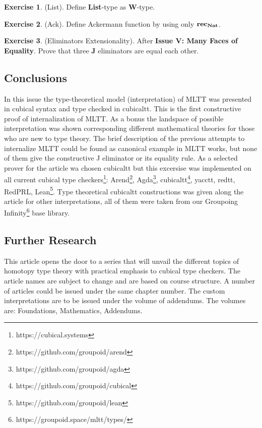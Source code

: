 \documentclass[twoside]{article}
\theoremstyle{definition}
\newtheorem{exercise}{Exercise}
\begin{document}
\begin{exercise} (List). Define {\bf List}-type as {\bf W}-type.
\end{exercise}

\begin{exercise} (Ack). Define Ackermann function by using only ${\bf rec_{Nat}}$.
\end{exercise}

\begin{exercise} (Eliminators Extensionality). After {\bf Issue V: Many Faces of Equality}. Prove that
three {\bf J} eliminators are equal each other.
\end{exercise}

\subsection*{Conclusions}

In this issue the type-theoretical model (interpretation) of MLTT was
presented in cubical syntax and type checked in cubicaltt.
This is the first constructive proof of internalization of MLTT.
As a bonus the landspace of possible interpretation was shown
corresponding different mathematical theories for those who are new to type theory.
The brief description of the previous attempts to internalize MLTT could
be found as canonical example in MLTT works, but none of them give the constructive
J eliminator or its equality rule. As a selected prover for the article wa
 chosen cubicaltt but this excersise was implemented on all current
 cubical type checkers\footnote{https://cubical.systems}:
Arend\footnote{https://github.com/groupoid/arend},
Agda\footnote{https://github.com/groupoid/agda},
cubicaltt\footnote{https://github.com/groupoid/cubical},
yacctt, redtt, RedPRL, Lean\footnote{https://github.com/groupoid/lean}.
Type theoretical cubicaltt constructions was given along the article for other interpretations,
all of them were taken from our Groupoing
Infinity\footnote{https://groupoid.space/mltt/types/} base library.

\subsection*{Further Research}

This article opens the door to a series that will unvail the different topics of
homotopy type theory with practical emphasis to cubical type checkers.
The article names are subject to change and are based on course structure.
A number of articles could be issued under the same chapter number. The custom
interpretations are to be issued under the volume of addendums. The volumes are:
Foundations, Mathematics, Addendums.
\end{document}
